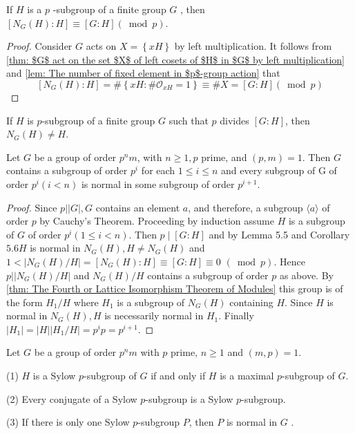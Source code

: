 \begin{lemma}
    If $H$ is a $p$ -subgroup of a finite group $G$ , then $\left[N_G(H): H\right] \equiv[G: H](\bmod p)$.
    \begin{proof}
        Consider $G$ acts on $X=\left\{xH\right\}$ by left multiplication.
        It follows from \ref{thm: $G$ act on the set $X$ of left cosets of $H$ in $G$ by left multiplication} and \ref{lem: The number of fixed element in $p$-group action} that
        \begin{equation*}
            \left[N_G(H):H\right]
            =
            \# \left\{xH: \#\mathcal{O}_{xH}=1\right\}
            \equiv
            \# X
            =
            \left[G:H\right]
            (\bmod p)
        \end{equation*}

    \end{proof}
\end{lemma}
\begin{corollary}
    If $H$ is $p$-subgroup of a finite group $G$ such that $p$ divides $[G: H]$, then $N_{G}(H) \neq H$.
\end{corollary}
\begin{theorem}
    Let $G$ be a group of order $p^{n} m$, with $n \geq 1, p$ prime, and $(p, m)=1$. Then $G$ contains a subgroup of order $p^{i}$ for each $1 \leq i \leq n$ and every subgroup of G of order $p^{i}(i<n)$ is normal in some subgroup of order $p^{i+1}$.
    \begin{proof}
        Since $p||G|, G$ contains an element $a$, and therefore, a subgroup $\langle a\rangle$ of order $p$ by Cauchy's Theorem.
        Proceeding by induction assume $H$ is a subgroup of $G$ of order $p^i(1 \leq i<n)$. Then $p \mid[G: H]$ and by Lemma 5.5 and Corollary $5.6 H$ is normal in $N_G(H), H \neq N_G(H)$ and $1<\left|N_G(H) / H\right|=\left[N_G(H): H\right] \equiv[G: H] \equiv 0$ $(\bmod p)$. Hence $p\left|\left|N_G(H) / H\right|\right.$ and $N_G(H) / H$ contains a subgroup of order $p$ as above.
        By \ref{thm: The Fourth or Lattice Isomorphism Theorem of Modules} this group is of the form $H_1 / H$ where $H_1$ is a subgroup of $N_G(H)$ containing $H$. Since $H$ is normal in $N_G(H), H$ is necessarily normal in $H_1$. Finally $\left|H_1\right|=|H|\left|H_1 / H\right|=p^i p=p^{i+1}$.
    \end{proof}
\end{theorem}

\begin{corollary}
    \label{cor: Corollary of first Sylow theorem}
    Let $G$ be a group of order $p^n m$ with $p$ prime, $n \geq 1$ and  $(m,p)=1$.

    (1) $H$ is a Sylow $p$-subgroup of $G$ if and only if $H$ is a maximal $p$-subgroup of $G$.

    (2)
    Every conjugate of a Sylow $p$-subgroup is a Sylow $p$-subgroup.

    (3) If there is only one Sylow $p$-subgroup $P$, then $P$ is normal in $G$ .
\end{corollary}

